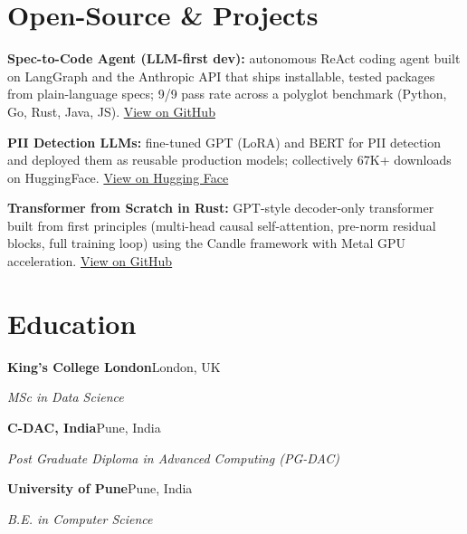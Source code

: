 \documentclass[10pt,a4paper]{article}
\begin{document}
\section{Open-Source \& Projects}
\begin{tight}
  \item \textbf{Spec-to-Code Agent (LLM-first dev):} autonomous ReAct coding agent built on LangGraph and the Anthropic API that ships installable, tested packages from plain-language specs; 9/9 pass rate across a polyglot benchmark (Python, Go, Rust, Java, JS). \href{https://github.com/abhijeetscode/Spec-to-Code-Agent}{View on GitHub}
  \item \textbf{PII Detection LLMs:} fine-tuned GPT (LoRA) and BERT for PII detection and deployed them as reusable production models; collectively 67K+ downloads on HuggingFace. \href{https://huggingface.co/ab-ai/pii_model}{View on Hugging Face}
  \item \textbf{Transformer from Scratch in Rust:} GPT-style decoder-only transformer built from first principles (multi-head causal self-attention, pre-norm residual blocks, full training loop) using the Candle framework with Metal GPU acceleration. \href{https://github.com/abhijeetscode/transformer-rust}{View on GitHub}
\end{tight}

\section{Education}
{\color{company}\bfseries King's College London}\hfill {\color{muted}London, UK}\par
{\itshape MSc in Data Science}\par\vspace{2pt}
{\color{company}\bfseries C-DAC, India}\hfill {\color{muted}Pune, India}\par
{\itshape Post Graduate Diploma in Advanced Computing (PG-DAC)}\par\vspace{2pt}
{\color{company}\bfseries University of Pune}\hfill {\color{muted}Pune, India}\par
{\itshape B.E. in Computer Science}\par
\end{document}

